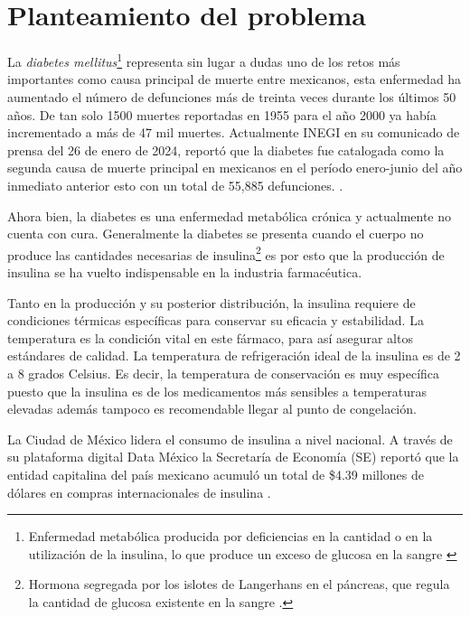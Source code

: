 
%

	\pagenumbering{roman}

\tableofcontents
\listoftables
\listoffigures


\newpage


\section*{Planteamiento del problema}


La \textit{diabetes mellitus}\footnote{Enfermedad metabólica producida por deficiencias en la cantidad o en la utilización de la insulina, lo que produce un exceso de glucosa en la sangre \cite{RAE01} } representa sin lugar a dudas uno de los retos más importantes como causa principal de muerte entre mexicanos, esta enfermedad ha aumentado el número de defunciones más de treinta veces durante los últimos 50 años. De tan solo 1500 muertes reportadas en 1955 para el año 2000 ya había incrementado a más de 47 mil muertes. Actualmente INEGI en su comunicado de prensa del 26 de enero de 2024, reportó que la diabetes fue catalogada como la segunda causa de muerte principal en mexicanos en el período enero-junio del año inmediato anterior esto con un total de 55,885 defunciones. \cite{hernandez2013, inegi2024}.

Ahora bien, la diabetes es una enfermedad metabólica crónica y actualmente no cuenta con cura. Generalmente la diabetes se presenta cuando el cuerpo no produce las cantidades necesarias de insulina\footnote{Hormona segregada por los islotes de Langerhans en el páncreas, que regula la cantidad de glucosa existente en la sangre \cite{RAE23}.} es por esto que la producción de insulina se ha vuelto indispensable en la industria farmacéutica.

Tanto en la producción y su posterior distribución, la insulina requiere de condiciones térmicas específicas para conservar su eficacia y estabilidad. La temperatura es la condición vital en este fármaco, para así asegurar altos estándares de calidad. La temperatura de refrigeración ideal de la insulina es de 2 a 8 grados Celsius. Es decir, la temperatura de conservación es muy específica puesto que la insulina es de los medicamentos más sensibles a temperaturas elevadas además tampoco es recomendable llegar al punto de congelación.

La Ciudad de México lidera el consumo de insulina a nivel nacional. A través de su plataforma digital Data México la Secretaría de Economía (SE) reportó que la entidad capitalina del país mexicano acumuló un total de \$4.39 millones de dólares en compras internacionales de insulina \cite{datamex}.

